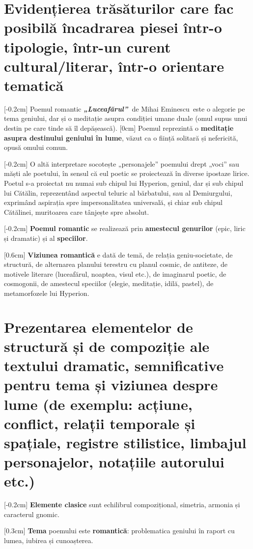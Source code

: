 \documentclass[
12pt,                        %
a4paper                      %
]{article}
\newcommand{\operatitle}{\textbf{\textit{„Luceafărul”\ }}} %
\newcommand{\operaauthor}{Mihai Eminescu\ } %
\begin{document}
\section{Evidențierea trăsăturilor care fac posibilă încadrarea piesei într-o tipologie, într-un curent cultural/literar, într-o orientare tematică}

[-0.2cm]
Poemul romantic \operatitle de \operaauthor este o alegorie pe tema geniului, dar și o meditație asupra condiției umane duale (omul supus unui destin pe care tinde să îl depășească).
[0cm]
Poemul reprezintă o \textbf{meditație asupra destinului geniului în lume}, văzut ca o ființă solitară și nefericită, opusă omului comun.

[-0.2cm]
O altă interpretare socotește „personajele” poemului drept „voci” sau măști ale poetului, în sensul că eul poetic se proiectează în diverse ipostaze lirice. Poetul s-a proiectat nu numai sub chipul lui Hyperion, geniul, dar și sub chipul lui Cătălin, reprezentând aspectul teluric al bărbatului, sau al Demiurgului, exprimând aspirația spre impersonalitatea universală, și chiar sub chipul Cătălinei, muritoarea care tânjește spre absolut.

[-0.2cm]
\textbf{Poemul romantic} se realizează prin \textbf{amestecul genurilor} (epic, liric și dramatic) și al \textbf{speciilor}.

[0.6cm]
\textbf{Viziunea romantică} e dată de temă, de relația geniu-societate, de structură, de alternarea planului terestru cu planul cosmic, de antiteze, de motivele literare (luceafărul, noaptea, visul etc.), de imaginarul poetic, de cosmogonii, de amestecul speciilor (elegie, meditație, idilă, pastel), de metamorfozele lui Hyperion.

\section{Prezentarea elementelor de structură și de compoziție ale textului dramatic, semnificative pentru tema și viziunea despre lume {\footnotesize (de exemplu: acțiune, conflict, relații temporale și spațiale, registre stilistice, limbajul personajelor, notațiile autorului etc.)}}

[-0.2cm]
\textbf{Elemente clasice} sunt echilibrul compozițional, simetria, armonia și caracterul gnomic.

[0.3cm]
\textbf{Tema} poemului este \textbf{romantică}: problematica geniului în raport cu lumea, iubirea și cunoașterea.
\end{document}
